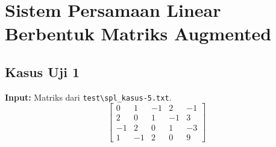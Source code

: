 \documentclass[12pt,a4paper]{report}
\begin{document}
\section{Sistem Persamaan Linear Berbentuk Matriks Augmented}
 
\subsection{Kasus Uji 1}
\textbf{Input:} Matriks dari \texttt{test\textbackslash spl\_kasus-5.txt}.
\[
\left[\begin{array}{cccc|c}
     0 &1 &-1 &2 &-1 \\
    2 &0 &1 &-1 &3 \\
    -1 &2 &0 &1 &-3 \\
    1 &-1 &2& 0 &9
\end{array}\right]
\]
\end{document}
